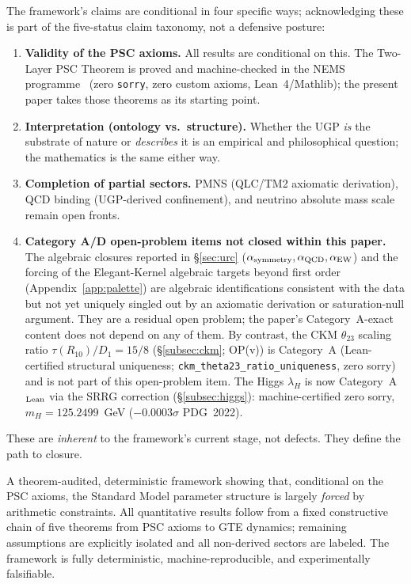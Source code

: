 \documentclass[11pt]{article}
\theoremstyle{remark}
\begin{document}
The framework's claims are conditional in four specific ways; acknowledging these is part of the five-status claim taxonomy, not a defensive posture:
\begin{enumerate}[leftmargin=1.2em,itemsep=0.1em]
  \item \textbf{Validity of the PSC axioms.} All results are conditional on this.
    The Two-Layer PSC Theorem is proved and machine-checked in the NEMS programme~\cite{SpivackNEMS05,SpivackUGPFormalization,SpivackNEMSHub} (zero \texttt{sorry}, zero custom axioms, Lean~4/Mathlib); the present paper takes those theorems as its starting point.
  \item \textbf{Interpretation (ontology vs.\ structure).} Whether the UGP \emph{is} the substrate of nature or \emph{describes} it is an empirical and philosophical question; the mathematics is the same either way.
  \item \textbf{Completion of partial sectors.} PMNS (QLC/TM2 axiomatic derivation), QCD binding (UGP-derived confinement), and neutrino absolute mass scale remain open fronts.
  \item \textbf{Category A/D open-problem items not closed within this paper.} The algebraic closures reported in \S\ref{sec:urc} ($\alpha_{\rm symmetry}, \alpha_{\rm QCD}, \alpha_{\rm EW}$) and the forcing of the Elegant-Kernel algebraic targets beyond first order (Appendix~\ref{app:palette}) are algebraic identifications consistent with the data but not yet uniquely singled out by an axiomatic derivation or saturation-null argument.  They are a residual open problem; the paper's Category~A-exact content does not depend on any of them.  By contrast, the CKM $\theta_{23}$ scaling ratio $\tau(R_{10})/D_1 = 15/8$ (\S\ref{subsec:ckm}; OP(v)) is Category~A (Lean-certified structural uniqueness; \texttt{ckm\_theta23\_ratio\_uniqueness}, zero sorry) and is not part of this open-problem item.  The Higgs $\lambda_H$ is now Category~A$_{\rm Lean}$ via the SRRG correction (\S\ref{subsec:higgs}): machine-certified zero sorry, $m_H = 125.2499$~GeV ($-0.0003\sigma$ PDG~2022).
\end{enumerate}
These are \emph{inherent} to the framework's current stage, not defects.
They define the path to closure.

\begin{tcolorbox}[colback=blue!4,colframe=blue!50!black,title={\textbf{Final Position}},fonttitle=\small\bfseries,left=4pt,right=4pt,top=4pt,bottom=4pt]
\small
A theorem-audited, deterministic framework showing that, conditional on the PSC axioms, the Standard Model parameter structure is largely \emph{forced} by arithmetic constraints.
All quantitative results follow from a fixed constructive chain of five theorems from PSC axioms to GTE dynamics; remaining assumptions are explicitly isolated and all non-derived sectors are labeled.
The framework is fully deterministic, machine-reproducible, and experimentally falsifiable.
\end{tcolorbox}
\end{document}
